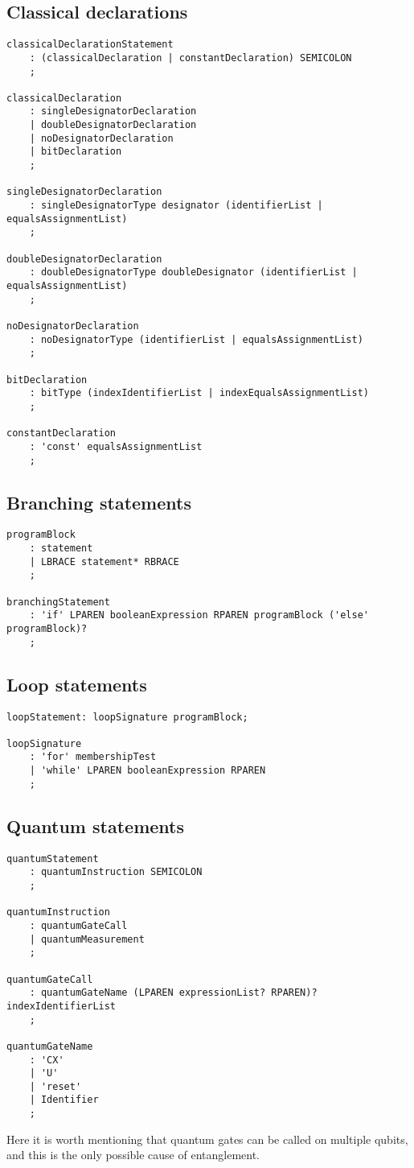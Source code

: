 \documentclass[12pt,a4paper]{report}
\theoremstyle{definition}
\theoremstyle{definition}
\theoremstyle{definition}
\begin{document}
\subsection{Classical declarations}
\begin{lstlisting}
classicalDeclarationStatement
    : (classicalDeclaration | constantDeclaration) SEMICOLON
    ;

classicalDeclaration
    : singleDesignatorDeclaration
    | doubleDesignatorDeclaration
    | noDesignatorDeclaration
    | bitDeclaration
    ;

singleDesignatorDeclaration
    : singleDesignatorType designator (identifierList | equalsAssignmentList)
    ;

doubleDesignatorDeclaration
    : doubleDesignatorType doubleDesignator (identifierList | equalsAssignmentList)
    ;

noDesignatorDeclaration
    : noDesignatorType (identifierList | equalsAssignmentList)
    ;

bitDeclaration
    : bitType (indexIdentifierList | indexEqualsAssignmentList)
    ;

constantDeclaration
    : 'const' equalsAssignmentList
    ;
\end{lstlisting}

\subsection{Branching statements}
\begin{lstlisting}
programBlock
    : statement
    | LBRACE statement* RBRACE
    ;

branchingStatement
    : 'if' LPAREN booleanExpression RPAREN programBlock ('else' programBlock)?
    ;
\end{lstlisting}


\subsection{Loop statements}
\begin{lstlisting}
loopStatement: loopSignature programBlock;

loopSignature
    : 'for' membershipTest
    | 'while' LPAREN booleanExpression RPAREN
    ;
\end{lstlisting}


\subsection{Quantum statements}
\begin{lstlisting}
quantumStatement
    : quantumInstruction SEMICOLON
    ;

quantumInstruction
    : quantumGateCall
    | quantumMeasurement
    ;

quantumGateCall
    : quantumGateName (LPAREN expressionList? RPAREN)? indexIdentifierList
    ;

quantumGateName
    : 'CX'
    | 'U'
    | 'reset'
    | Identifier
    ;
\end{lstlisting}
Here it is worth mentioning that quantum gates can be called on multiple qubits, and this is the only possible cause of entanglement.
\end{document}
